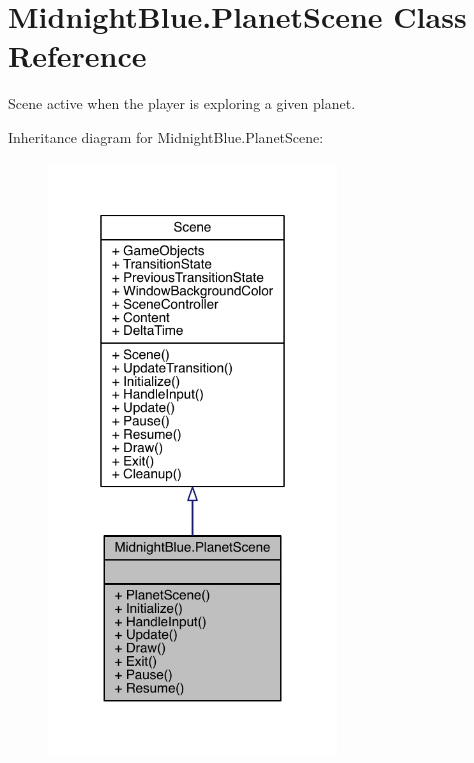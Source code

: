 \hypertarget{class_midnight_blue_1_1_planet_scene}{}\section{Midnight\+Blue.\+Planet\+Scene Class Reference}
\label{class_midnight_blue_1_1_planet_scene}


Scene active when the player is exploring a given planet.  




Inheritance diagram for Midnight\+Blue.\+Planet\+Scene\+:\nopagebreak
\begin{figure}[H]
\begin{center}
\leavevmode
\includegraphics[width=217pt]{class_midnight_blue_1_1_planet_scene__inherit__graph}
\end{center}
\end{figure}


